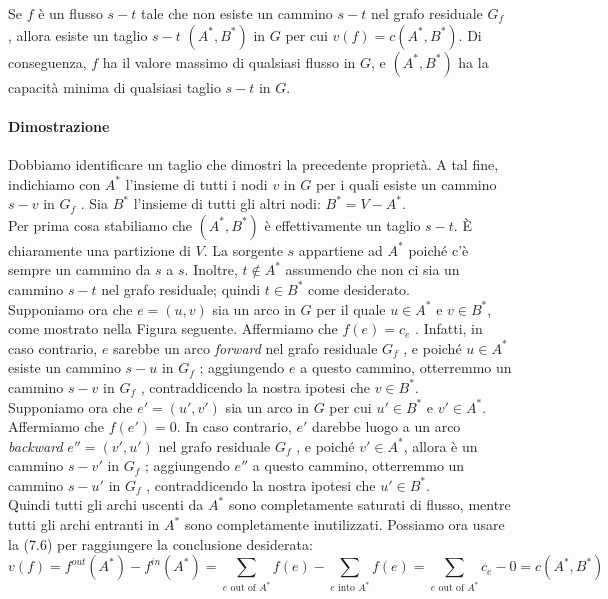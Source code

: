 \begin{myblockquote}
	Se $f$ è un flusso $s-t$ tale che non esiste un cammino $s-t$ nel
	grafo residuale $G_f$ , allora esiste un taglio $s-t$
	$(A^{*} , B^{*})$ in $G$ per cui $v(f) = c(A^{*} , B^{*})$. Di
	conseguenza, $f$ ha il valore massimo di qualsiasi flusso in $G$, e
	$(A^{*} , B^{*})$ ha la capacità minima di qualsiasi taglio $s-t$ in
	$G$.
\end{myblockquote}


\paragraph{Dimostrazione}

Dobbiamo identificare un taglio che dimostri la precedente proprietà. A
tal fine, indichiamo con $A^{*}$ l'insieme di tutti i nodi $v$ in
$G$ per i quali esiste un cammino $s-v$ in $G_f$ . Sia $B^{*}$
l'insieme di tutti gli altri nodi: $B^{*} = V - A^{*}$.\\

Per prima cosa stabiliamo che $(A^{*} , B^{*})$ è effettivamente un taglio
$s-t$. È chiaramente una partizione di $V$. La sorgente $s$
appartiene ad $A^{*}$ poiché c'è sempre un cammino da $s$ a $s$.
Inoltre, $t \notin A^{*}$ assumendo che non ci sia un cammino $s-t$
nel grafo residuale; quindi $t \in B^*$ come desiderato.\\

Supponiamo ora che $e = (u, v)$ sia un arco in $G$ per il quale
$u \in A^{*}$ e $v \in B^{*}$, come mostrato nella Figura seguente.
Affermiamo che $f(e) = c_e$ . Infatti, in caso contrario, $e$
sarebbe un arco \emph{forward} nel grafo residuale $G_f$ , e poiché
$u \in A^{*}$ esiste un cammino $s-u$ in $G_f$ ; aggiungendo $e$ a
questo cammino, otterremmo un cammino $s-v$ in $G_f$ ,
contraddicendo la nostra ipotesi che $v \in B^{*}$.\\

Supponiamo ora che $e' = (u' , v')$ sia un arco in $G$ per cui
$u' \in B^{*}$ e $v' \in A^{*}$. Affermiamo che $f(e') = 0$. In caso
contrario, $e'$ darebbe luogo a un arco \emph{backward}
$e'' = (v' , u')$ nel grafo residuale $G_f$ , e poiché
$v' \in A^{*}$, allora è un cammino $s-v'$ in $G_f$ ; aggiungendo
$e''$ a questo cammino, otterremmo un cammino $s-u'$ in $G_f$ ,
contraddicendo la nostra ipotesi che $u' \in B^{*}$.\\

Quindi tutti gli archi uscenti da $A^{*}$ sono completamente saturati di
flusso, mentre tutti gli archi entranti in $A^{*}$ sono completamente
inutilizzati. Possiamo ora usare la (7.6) per raggiungere la conclusione
desiderata:
$$
	v(f) = f^{out}(A^{*}) - f^{in}(A^{*}) = \sum_{e \text{ out of }A^{*}} f(e) - \sum_{e \text{ into }A^{*}}f(e) = \sum_{e \text{ out of }A^{*}} c_e - 0 = c(A^{*}, B^{*})
$$

